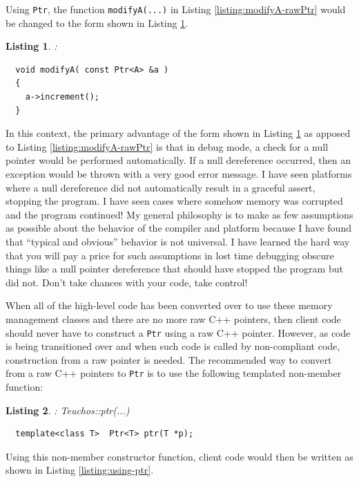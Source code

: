 \documentclass[pdf,ps2pdf,11pt]{SANDreport}
\newtheorem{listing}{Listing}
\begin{document}
Using {}\texttt{Ptr}, the function {}\texttt{modifyA(...)} in Listing
{}\ref{listing:modifyA-rawPtr} would be changed to the form shown in
Listing {}\ref{listing:modifyA-Ptr}.

\begin{listing}:\\
\label{listing:modifyA-Ptr}
{\small\begin{verbatim}
  void modifyA( const Ptr<A> &a )
  {
    a->increment();
  }
\end{verbatim}}
\end{listing}

In this context, the primary advantage of the form shown in Listing
{}\ref{listing:modifyA-Ptr} as apposed to Listing
{}\ref{listing:modifyA-rawPtr} is that in debug mode, a check for a
null pointer would be performed automatically.  If a null dereference
occurred, then an exception would be thrown with a very good error
message. I have seen platforms where a null dereference did not
automatically result in a graceful assert, stopping the program.  I
have seen cases where somehow memory was corrupted and the program
continued!  My general philosophy is to make as few assumptions as
possible about the behavior of the compiler and platform because I
have found that ``typical and obvious'' behavior is not universal.  I
have learned the hard way that you will pay a price for such
assumptions in lost time debugging obscure things like a null pointer
dereference that should have stopped the program but did not.  Don't
take chances with your code, take control!

When all of the high-level code has been converted over to use these
memory management classes and there are no more raw C++ pointers, then
client code should never have to construct a {}\texttt{Ptr} using a
raw C++ pointer.  However, as code is being transitioned over and
when such code is called by non-compliant code, construction from a
raw pointer is needed.  The recommended way to convert from a raw C++
pointers to {}\texttt{Ptr} is to use the following templated
non-member function:

\begin{listing}: Teuchos::ptr(...)\\
\label{listing:ptr}
{\small\begin{verbatim}
  template<class T>  Ptr<T> ptr(T *p);
\end{verbatim}}
\end{listing}

Using this non-member constructor function, client code would then be
written as shown in Listing {}\ref{listing:using-ptr}.
\end{document}
